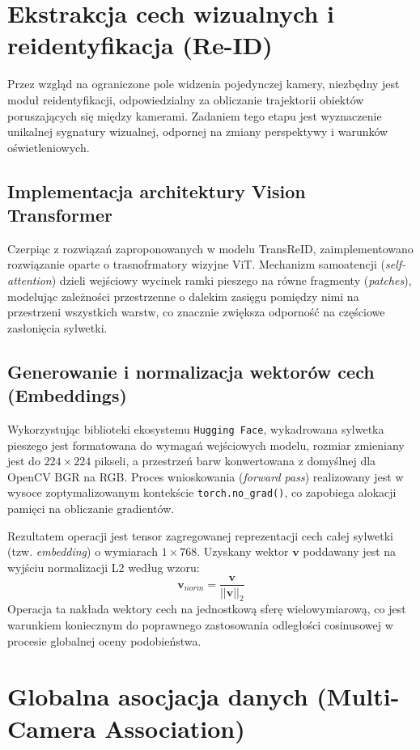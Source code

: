 \section{Ekstrakcja cech wizualnych i reidentyfikacja (Re-ID)}

Przez wzgląd na ograniczone pole widzenia pojedynczej kamery, niezbędny jest moduł reidentyfikacji,
odpowiedzialny za obliczanie trajektorii obiektów poruszających się między kamerami. Zadaniem tego
etapu jest wyznaczenie unikalnej sygnatury wizualnej, odpornej na zmiany perspektywy i warunków
oświetleniowych.

\subsection{Implementacja architektury Vision Transformer}

Czerpiąc z rozwiązań zaproponowanych w modelu TransReID, zaimplementowano rozwiązanie oparte o
trasnofrmatory wizyjne ViT. Mechanizm samoatencji (\textit{self-attention}) dzieli wejściowy
wycinek ramki pieszego na równe fragmenty (\textit{patches}), modelując zależności przestrzenne o
dalekim zasięgu pomiędzy nimi na przestrzeni wszystkich warstw, co znacznie zwiększa odporność na
częściowe zasłonięcia sylwetki.

\subsection{Generowanie i normalizacja wektorów cech (Embeddings)}

Wykorzystując biblioteki ekosystemu \texttt{Hugging Face}, wykadrowana sylwetka pieszego jest
formatowana do wymagań wejściowych modelu, rozmiar zmieniany jest do $224 \times 224$ pikseli, a
przestrzeń barw konwertowana z domyślnej dla OpenCV BGR na RGB. Proces wnioskowania
(\textit{forward pass}) realizowany jest w wysoce zoptymalizowanym kontekście
\texttt{torch.no\_grad()}, co zapobiega alokacji pamięci na obliczanie gradientów.

Rezultatem operacji jest tensor zagregowanej reprezentacji cech całej sylwetki (tzw.
\textit{embedding}) o wymiarach $1 \times 768$. Uzyskany wektor $\mathbf{v}$ poddawany jest na
wyjściu normalizacji L2 według wzoru: $$ \mathbf{v}_{norm} = \frac{\mathbf{v}}{||\mathbf{v}||_2} $$
Operacja ta nakłada wektory cech na jednostkową sferę wielowymiarową, co jest warunkiem koniecznym
do poprawnego zastosowania odległości cosinusowej w procesie globalnej oceny podobieństwa.

\section{Globalna asocjacja danych (Multi-Camera Association)}


